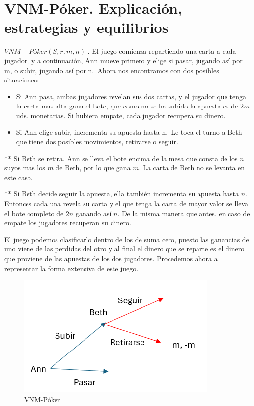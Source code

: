 \documentclass[12pt,a4paper,]{book}
\numberwithin{dummy}{section}
\theoremstyle{ocrenumbox}
\theoremstyle{blacknumex}
\theoremstyle{blacknumbox}
\theoremstyle{ocrenum}
\theoremstyle{ocrenum}
\begin{document}
\hypertarget{Seccion51}{%
\section{VNM-Póker. Explicación, estrategias y
equilibrios}\label{Seccion51}}

\textbf{\(VNM-Póker(S,r,m,n)\)} . El juego comienza repartiendo una
carta a cada jugador, y a continuación, Ann mueve primero y elige si
pasar, jugando así por m, o subir, jugando así por n.~Ahora nos
encontramos con dos posibles situaciones:

\begin{itemize}
\item
  Si Ann pasa, ambas jugadores revelan sus dos cartas, y el jugador que
  tenga la carta mas alta gana el bote, que como no se ha subido la
  apuesta es de \(2m\) uds. monetarias. Si hubiera empate, cada jugador
  recupera su dinero.
\item
  Si Ann elige subir, incrementa su apuesta hasta n.~Le toca el turno a
  Beth que tiene dos posibles movimientos, retirarse o seguir.
\end{itemize}

** Si Beth se retira, Ann se lleva el bote encima de la mesa que consta
de los \(n\) suyos mas los \(m\) de Beth, por lo que gana \(m\). La
carta de Beth no se levanta en este caso.

** Si Beth decide seguir la apuesta, ella también incrementa su apuesta
hasta \(n\). Entonces cada una revela su carta y el que tenga la carta
de mayor valor se lleva el bote completo de \(2n\) ganando así \(n\). De
la misma manera que antes, en caso de empate los jugadores recuperan su
dinero.

El juego podemos clasificarlo dentro de los de suma cero, puesto las
ganancias de uno viene de las perdidas del otro y al final el dinero que
se reparte es el dinero que proviene de las apuestas de los dos
jugadores. Procedemos ahora a representar la forma extensiva de este
juego.

\begin{figure}[H]

{\centering \includegraphics[width=0.8\linewidth]{extensiva_VNM} 

}

\caption{\label{forma_extensiva_VNM}VNM-Póker}\label{fig:VNM_Khun}
\end{figure}
\end{document}
